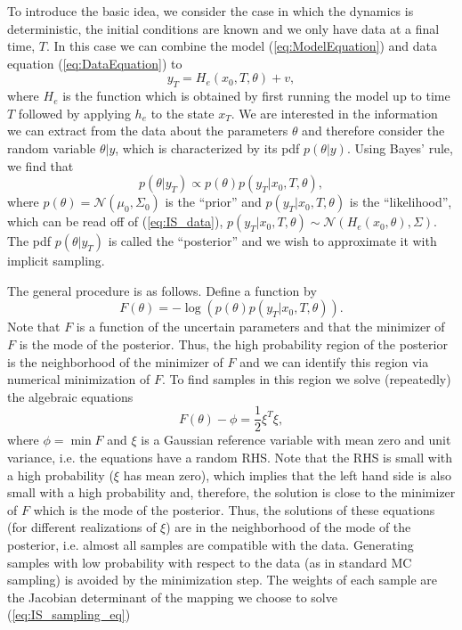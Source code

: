 \documentclass[11pt]{article}
\begin{document}
To introduce the basic idea,
we consider the case in which the dynamics is deterministic, the initial conditions are known and we only have data at a final time, $T$.
In this case we can combine the model (\ref{eq:ModelEquation}) and data equation (\ref{eq:DataEquation}) to
\begin{equation}
\label{eq:IS_data}
	y_T = H_e(x_0,T,\theta)+v,
\end{equation}
where $H_e$ is the function which is obtained by first running the model up
to time $T$ followed by applying $h_e$ to the state $x_T$. We are interested in the information we can extract from the data about the parameters $\theta$ and
therefore consider the random variable $\theta|y$, which is characterized by its pdf $p(\theta|y)$. Using Bayes' rule, we find that
\begin{equation}
	p(\theta|y_T) \propto p(\theta)p(y_T|x_0,T,\theta),
\end{equation}
where  $p(\theta) = \mathcal{N}(\mu_0,\Sigma_0)$ is the ``prior'' and $p(y_T|x_0,T,\theta)$ is the ``likelihood'',
which can be read off of (\ref{eq:IS_data}), $p(y_T|x_0,T,\theta)\sim \mathcal{N}(H_e(x_0,\theta),\Sigma)$.
The pdf $p(\theta|y_T)$  is called the ``posterior'' and we wish to approximate it with implicit sampling. 

The general procedure is as follows. Define a function by
\begin{equation}
	F(\theta)= -\log \left(p(\theta)p(y_T|x_0,T,\theta)\right).
\end{equation}
Note that $F$ is a function of the uncertain parameters and that the minimizer of $F$ is the mode of the posterior. Thus, the high probability region of the posterior is the neighborhood of the minimizer of $F$ and we can identify this region via numerical minimization of $F$. To find samples in this region we solve (repeatedly) the algebraic equations
\begin{equation}
\label{eq:IS_sampling_eq}
	F(\theta)-\phi = \frac{1}{2}\xi^T\xi,
\end{equation}
where $\phi = \min F$ and $\xi$ is a Gaussian reference variable with mean zero and unit variance, i.e. the equations have a random RHS.
Note that the RHS is small with a high probability ($\xi$ has mean zero), which implies that the left hand side is also small with a high probability and, therefore, the solution is close to the minimizer of $F$ which is the mode of the posterior.
Thus, the solutions of these equations (for different realizations of $\xi$) are in the neighborhood of the mode of the posterior, i.e. almost all samples are compatible with the data.
Generating samples with low probability with respect to the data (as in standard MC sampling) is avoided by the minimization step. The weights of each sample are the Jacobian determinant of the mapping we choose to solve (\ref{eq:IS_sampling_eq})  
\end{document}
